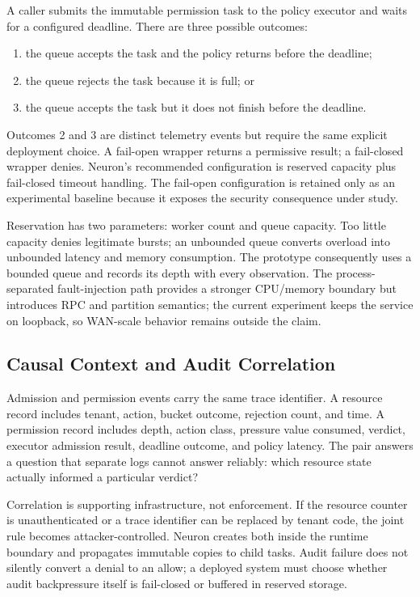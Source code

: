 A caller submits the immutable permission task to the policy executor and
waits for a configured deadline. There are three possible outcomes:

\begin{enumerate}
  \item the queue accepts the task and the policy returns before the
  deadline;
  \item the queue rejects the task because it is full; or
  \item the queue accepts the task but it does not finish before the
  deadline.
\end{enumerate}

Outcomes 2 and 3 are distinct telemetry events but require the same explicit
deployment choice. A fail-open wrapper returns a permissive result; a
fail-closed wrapper denies. Neuron's recommended configuration is reserved
capacity plus fail-closed timeout handling. The fail-open configuration is
retained only as an experimental baseline because it exposes the security
consequence under study.

Reservation has two parameters: worker count and queue capacity. Too little
capacity denies legitimate bursts; an unbounded queue converts overload into
unbounded latency and memory consumption. The prototype consequently uses a
bounded queue and records its depth with every observation. The process-
separated fault-injection path provides a stronger CPU/memory boundary but
introduces RPC and partition semantics; the current experiment keeps the
service on loopback, so WAN-scale behavior remains outside the claim.

\subsection{Causal Context and Audit Correlation}

Admission and permission events carry the same trace identifier. A resource
record includes tenant, action, bucket outcome, rejection count, and time. A
permission record includes depth, action class, pressure value consumed,
verdict, executor admission result, deadline outcome, and policy latency.
The pair answers a question that separate logs cannot answer reliably:
which resource state actually informed a particular verdict?

Correlation is supporting infrastructure, not enforcement. If the resource
counter is unauthenticated or a trace identifier can be replaced by tenant
code, the joint rule becomes attacker-controlled. Neuron creates both inside
the runtime boundary and propagates immutable copies to child tasks. Audit
failure does not silently convert a denial to an allow; a deployed system
must choose whether audit backpressure itself is fail-closed or buffered in
reserved storage.

